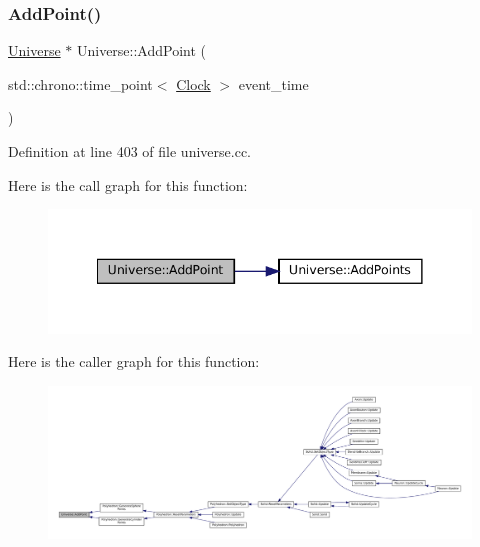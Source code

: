 \subsubsection{\texorpdfstring{Add\+Point()}{AddPoint()}}
{\footnotesize\ttfamily \mbox{\hyperlink{class_universe}{Universe}} $\ast$ Universe\+::\+Add\+Point (\begin{DoxyParamCaption}\item[{std\+::chrono\+::time\+\_\+point$<$ \mbox{\hyperlink{universe_8h_a0ef8d951d1ca5ab3cfaf7ab4c7a6fd80}{Clock}} $>$}]{event\+\_\+time }\end{DoxyParamCaption})}



Definition at line 403 of file universe.\+cc.

Here is the call graph for this function\+:\nopagebreak
\begin{figure}[H]
\begin{center}
\leavevmode
\includegraphics[width=341pt]{class_universe_a8508b791c6997d8abcdcc037a6776734_cgraph}
\end{center}
\end{figure}
Here is the caller graph for this function\+:\nopagebreak
\begin{figure}[H]
\begin{center}
\leavevmode
\includegraphics[width=350pt]{class_universe_a8508b791c6997d8abcdcc037a6776734_icgraph}
\end{center}
\end{figure}
\mbox{\label{class_universe_aa48ced2078ba863723050d8283b3fa67}} 
